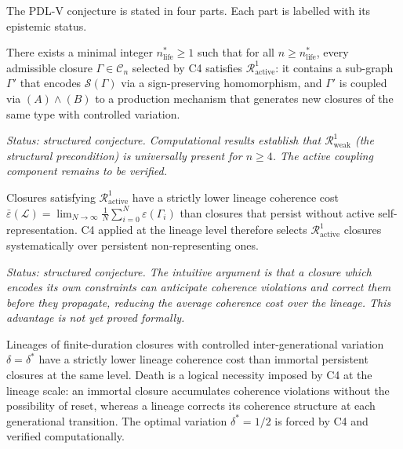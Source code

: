 \documentclass[12pt,a4paper]{article}
\theoremstyle{plain}
\theoremstyle{definition}
\theoremstyle{remark}
\newenvironment{conjecturebox}[1][]{%
  \begin{tcolorbox}[conjecturestyle,title={Conjecture\ifx\relax#1\relax\else: #1\fi}]}{\end{tcolorbox}}
\newcommand{\PDL}{\textsc{PDL}}
\newcommand{\Calg}{\mathcal{C}}
\newcommand{\Sop}{\mathcal{S}}
\newcommand{\Rop}{\mathcal{R}}
\newcommand{\eps}{\varepsilon}
\begin{document}
The \PDL-V conjecture is stated in four parts. Each part is labelled with its
epistemic status.

\begin{conjecturebox}[PDL-V, Part 1 --- Existence of the life threshold]
There exists a minimal integer $n^{*}_{\mathrm{life}} \geq 1$ such that for all
$n \geq n^{*}_{\mathrm{life}}$, every admissible closure $\Gamma \in \Calg_n$
selected by C4 satisfies $\Rop^1_{\mathrm{active}}$: it contains a sub-graph
$\Gamma'$ that encodes $\Sop(\Gamma)$ via a sign-preserving homomorphism, and
$\Gamma'$ is coupled via $(A)\wedge(B)$ to a production mechanism that generates
new closures of the same type with controlled variation.
\end{conjecturebox}

\emph{Status: structured conjecture. Computational results establish that
$\Rop^1_{\mathrm{weak}}$ (the structural precondition) is universally present for
$n \geq 4$. The active coupling component remains to be verified.}

\begin{conjecturebox}[PDL-V, Part 2 --- Selection by C4]
Closures satisfying $\Rop^1_{\mathrm{active}}$ have a strictly lower lineage
coherence cost $\bar{\eps}(\mathcal{L}) = \lim_{N \to \infty} \frac{1}{N}
\sum_{i=0}^{N} \eps(\Gamma_i)$ than closures that persist without active
self-representation. C4 applied at the lineage level therefore selects
$\Rop^1_{\mathrm{active}}$ closures systematically over persistent non-representing
ones.
\end{conjecturebox}

\emph{Status: structured conjecture. The intuitive argument is that a closure which
encodes its own constraints can anticipate coherence violations and correct them
before they propagate, reducing the average coherence cost over the lineage. This
advantage is not yet proved formally.}

\begin{conjecturebox}[PDL-V, Part 3 --- Necessity of the birth--death cycle]
Lineages of finite-duration closures with controlled inter-generational variation
$\delta = \delta^{*}$ have a strictly lower lineage coherence cost than immortal
persistent closures at the same level. Death is a logical necessity imposed by C4
at the lineage scale: an immortal closure accumulates coherence violations without
the possibility of reset, whereas a lineage corrects its coherence structure at each
generational transition. The optimal variation $\delta^{*} = 1/2$ is forced by C4
and verified computationally.
\end{conjecturebox}
\end{document}

